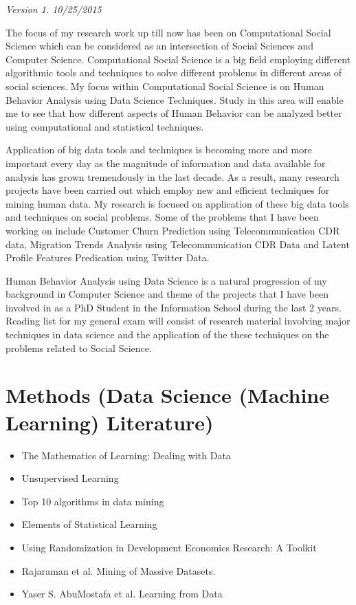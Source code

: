 \textit{Version 1. 10/25/2015} 

The focus of my research work up till now has been on Computational Social Science which can be considered as an intersection of Social Sciences and Computer Science. Computational Social Science is a big field employing different algorithmic tools and techniques to solve different problems in different areas of social sciences. My focus within Computational Social Science is on Human Behavior Analysis using Data Science Techniques. Study in this area will enable me to see that how different aspects of Human Behavior can be analyzed better using computational and statistical techniques.

Application of big data tools and techniques is becoming more and more important every day as the magnitude of information and data available for analysis has grown tremendously in the last decade. As a result, many research projects have been carried out which employ new and efficient techniques for mining human data. My research is focused on application of these big data tools and techniques on social problems. Some of the problems that I have been working on include Customer Churn Prediction using Telecommunication CDR data, Migration Trends Analysis using Telecommunication CDR Data  and Latent Profile Features Predication using Twitter Data.

Human Behavior Analysis using Data Science is a natural progression of my background in Computer Science and theme of the projects that I have been involved in as a PhD Student in the Information School during the last 2 years. 
Reading list for my general exam will consist of research material involving major techniques in data science and the application of the these techniques on the problems related to Social Science. 

\section{Methods (Data Science (Machine Learning) Literature)}
\begin{itemize}
\item The Mathematics of Learning: Dealing with Data\cite{Poggio_2005}
\item Unsupervised Learning \cite{Ghahramani_2004}

\item Top 10 algorithms in data mining \cite{2009}

\item Elements of Statistical Learning \cite{StatisticalLearning_2009}
\item Using Randomization in Development Economics Research: A Toolkit \cite{Duflo} 
\item Rajaraman et al. Mining of Massive Datasets. \cite{Rajaraman_2009}
\item Yaser S. AbuMostafa et al. Learning from Data \cite{Abu-Mostafa:2012:LD:2207825}
\end{itemize}

